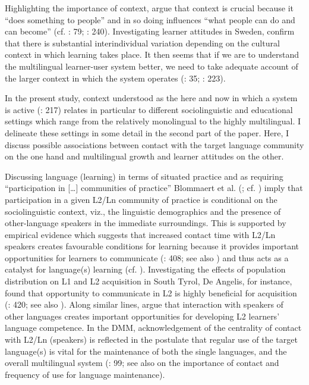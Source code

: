 \documentclass[output=paper]{../langscibook}
\begin{document}
Highlighting the importance of context, \citet[203]{BlommaertEtAl2005} argue that context is crucial because it “does something to people” and in so doing influences “what people can do and can become” (cf. \citealt{Cenoz2013Influence}: 79; \citealt{VanGeertEtAl2011}: 240). Investigating learner attitudes in Sweden, \citet[611]{HenryApelgren2008} confirm that there is substantial interindividual variation depending on the cultural context in which learning takes place. It then seems that if we are to understand the multilingual learner-user system better, we need to take adequate account of the larger context in which the system operates (\citealt{Larsen-FreemanCameron2008}: 35; \citealt{PaladinoVaes2009}: 223). 

In the present study, context understood as the here and now in which a system is active (\citealt{ThelenSmith1994}: 217) relates in particular to different sociolinguistic and educational settings which range from the relatively monolingual to the highly multilingual. I delineate these settings in some detail in the second part of the paper. Here, I discuss possible associations between contact with the target language community on the one hand and multilingual growth and learner attitudes on the other.

Discussing language (learning) in terms of situated practice and as requiring “participation in […] communities of practice” Blommaert et al. (\citeyear[206]{BlommaertEtAl2005}; cf. \citealt[81]{Cenoz2013Influence}) imply that participation in a given L2/Ln community of practice is conditional on the sociolinguistic context, viz., the linguistic demographics and the presence of other-language speakers in the immediate surroundings. This is supported by empirical evidence which suggests that increased contact time with L2/Ln speakers creates favourable conditions for learning because it provides important opportunities for learners to communicate (\citealt{DeAngelis2012}: 408; see also \citealt{Kordt2018}) and thus acts as a catalyst for language(s) learning (cf. \citealt{Bozzo2014}). Investigating the effects of population distribution on L1 and L2 acquisition in South Tyrol, De Angelis, for instance, found that opportunity to communicate in L2 is highly beneficial for acquisition (\citealt{DeAngelis2012}: 420; see also \citealt{DeAngelisNodate}). Along similar lines, \citet[63]{CsizerKormos2009} argue that interaction with speakers of other languages creates important opportunities for developing L2 learners’ language competence. In the DMM, acknowledgement of the centrality of contact with L2/Ln (speakers) is reflected in the postulate that regular use of the target language(s) is vital for the maintenance of both the single languages, and the overall multilingual system (\citealt{HerdinaJessner2002}: 99; see also \citealt[158]{Schmid2011} on the importance of contact and frequency of use for language maintenance).
\end{document}
